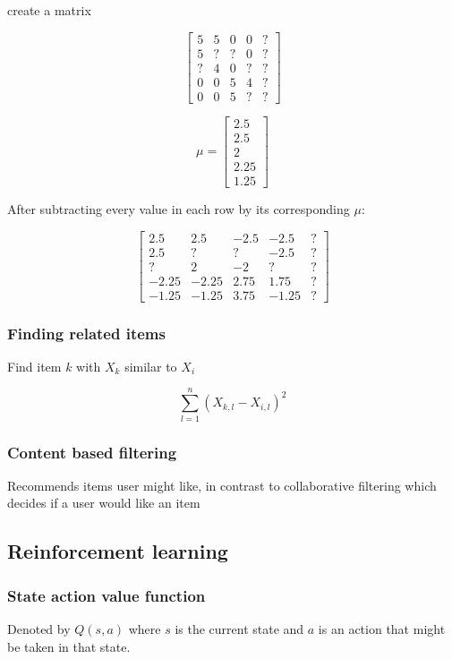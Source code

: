 \documentclass[12pt]{article}
\begin{document}
create a matrix

\[
\begin{bmatrix}
    5 & 5 & 0 & 0 & ?\\
    5 & ? & ? & 0 & ?\\
    ? & 4 & 0 & ? & ?\\
    0 & 0 & 5 & 4 & ?\\
    0 & 0 & 5 & ? & ?
\end{bmatrix}
\]

\[
    \mu =
    \begin{bmatrix}
        2.5\\
        2.5\\
        2\\
        2.25\\
        1.25
    \end{bmatrix}
\]

After subtracting every value in each row by its corresponding $\mu$:

\[
    \begin{bmatrix}
        2.5 & 2.5 & -2.5 & -2.5 & ?\\
        2.5 & ? & ? & -2.5 & ?\\
        ? & 2 & -2 & ? & ?\\
        -2.25 & -2.25 & 2.75 & 1.75 & ?\\
        -1.25 & -1.25 & 3.75 & -1.25 & ?
    \end{bmatrix}
\]

\subsubsection{Finding related items}

Find item $k$ with $X_k$ similar to $X_i$

\[ \sum_{l=1}^n (X_{k,l} - X_{i,l})^2 \]

\subsubsection{Content based filtering}

Recommends items user might like, in contrast to collaborative filtering which decides if a user
would like an item

\subsection{Reinforcement learning}

\subsubsection{State action value function}

Denoted by $Q(s,a)$ where $s$ is the current state and $a$ is an action that might
be taken in that state.
\end{document}
